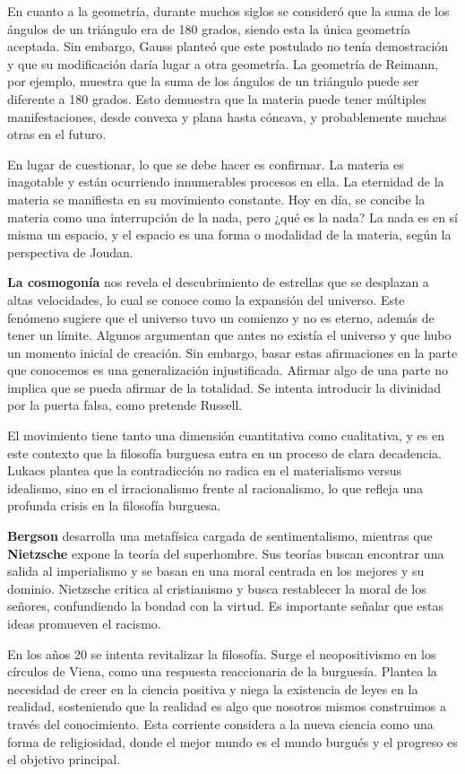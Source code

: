 \documentclass[
  jou,
  floatsintext,
  longtable,
  a4paper,
  nolmodern,
  notxfonts,
  notimes,
  12pt,
  colorlinks=true,linkcolor=blue,citecolor=blue,urlcolor=blue]{apa7}
\begin{document}
En cuanto a la geometría, durante muchos siglos se consideró que la suma
de los ángulos de un triángulo era de 180 grados, siendo esta la única
geometría aceptada. Sin embargo, Gauss planteó que este postulado no
tenía demostración y que su modificación daría lugar a otra geometría.
La geometría de Reimann, por ejemplo, muestra que la suma de los ángulos
de un triángulo puede ser diferente a 180 grados. Esto demuestra que la
materia puede tener múltiples manifestaciones, desde convexa y plana
hasta cóncava, y probablemente muchas otras en el futuro.

En lugar de cuestionar, lo que se debe hacer es confirmar. La materia es
inagotable y están ocurriendo innumerables procesos en ella. La
eternidad de la materia se manifiesta en su movimiento constante. Hoy en
día, se concibe la materia como una interrupción de la nada, pero ¿qué
es la nada? La nada es en sí misma un espacio, y el espacio es una forma
o modalidad de la materia, según la perspectiva de Joudan.

\textbf{La cosmogonía} nos revela el descubrimiento de estrellas que se
desplazan a altas velocidades, lo cual se conoce como la expansión del
universo. Este fenómeno sugiere que el universo tuvo un comienzo y no es
eterno, además de tener un límite. Algunos argumentan que antes no
existía el universo y que hubo un momento inicial de creación. Sin
embargo, basar estas afirmaciones en la parte que conocemos es una
generalización injustificada. Afirmar algo de una parte no implica que
se pueda afirmar de la totalidad. Se intenta introducir la divinidad por
la puerta falsa, como pretende Russell.

El movimiento tiene tanto una dimensión cuantitativa como cualitativa, y
es en este contexto que la filosofía burguesa entra en un proceso de
clara decadencia. Lukacs plantea que la contradicción no radica en el
materialismo versus idealismo, sino en el irracionalismo frente al
racionalismo, lo que refleja una profunda crisis en la filosofía
burguesa.

\textbf{Bergson} desarrolla una metafísica cargada de sentimentalismo,
mientras que \textbf{Nietzsche} expone la teoría del superhombre. Sus
teorías buscan encontrar una salida al imperialismo y se basan en una
moral centrada en los mejores y su dominio. Nietzsche critica al
cristianismo y busca restablecer la moral de los señores, confundiendo
la bondad con la virtud. Es importante señalar que estas ideas promueven
el racismo.

En los años 20 se intenta revitalizar la filosofía. Surge el
neopositivismo en los círculos de Viena, como una respuesta reaccionaria
de la burguesía. Plantea la necesidad de creer en la ciencia positiva y
niega la existencia de leyes en la realidad, sosteniendo que la realidad
es algo que nosotros mismos construimos a través del conocimiento. Esta
corriente considera a la nueva ciencia como una forma de religiosidad,
donde el mejor mundo es el mundo burgués y el progreso es el objetivo
principal.
\end{document}
